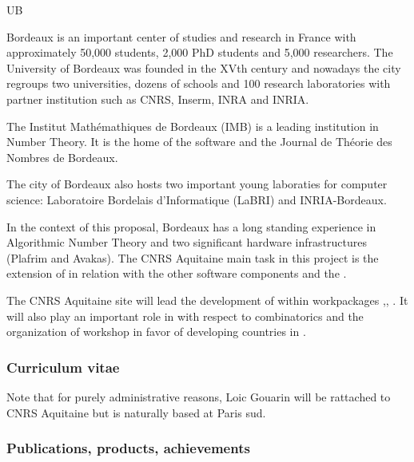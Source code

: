 \begin{sitedescription}{UB}


Bordeaux is an important center of studies and research in France
with approximately 50,000 students, 2,000 PhD students and 5,000
researchers. The University of Bordeaux was founded in the XVth
century and nowadays the city regroups two universities, dozens of
schools and 100 research laboratories with partner institution such
as CNRS, Inserm, INRA and INRIA.

The Institut Math\'emathiques de Bordeaux (IMB) is a leading
institution in Number Theory. It is the home of the software
\PariGP and the Journal de Th\'eorie des Nombres de Bordeaux.

The city of Bordeaux also hosts two important young laboraties
for computer science: Laboratoire Bordelais d'Informatique (LaBRI)
and INRIA-Bordeaux.

\medskip
In the context of this proposal, Bordeaux has a long standing experience in
Algorithmic Number Theory and two significant hardware infrastructures
(Plafrim and Avakas). The CNRS Aquitaine main task in this project is the
extension of \PariGP in relation with the other software components and
the .

The CNRS Aquitaine site will lead the development of \PariGP within
workpackages ,, . It will also play
an important role in  with respect to combinatorics
and the organization of workshop in favor of developing countries in .

\subsubsection*{Curriculum vitae}
Note that for purely administrative reasons, Loic Gouarin will be rattached to
CNRS Aquitaine but is naturally based at Paris sud.









\subsubsection*{Publications, products, achievements}


\end{sitedescription}
